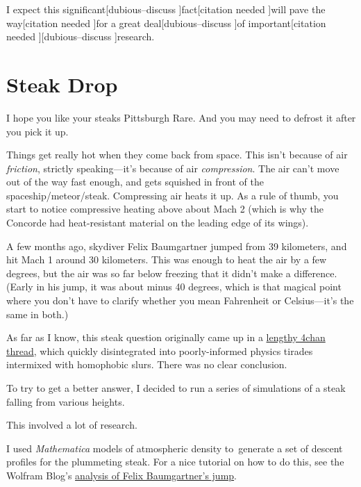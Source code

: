 {I expect this significant[{dubious–discuss} ]fact[{citation needed} ]will pave the way[{citation needed} ]for a great deal[{dubious–discuss} ]of important[{citation needed} ][{dubious–discuss} ]research.}

{
\chapter{Steak Drop}
}

\hfill{}

{I hope you like your steaks Pittsburgh Rare. And you may need to defrost it after you pick it up.}

{Things get really hot when they come back from space. This isn’t because of air \emph{friction}, strictly speaking—it’s because of air \emph{compression}. The air can’t move out of the way fast enough, and gets squished in front of the spaceship/meteor/steak. Compressing air heats it up. As a rule of thumb, you start to notice compressive heating above about Mach 2 (which is why the Concorde had heat-resistant material on the leading edge of its wings).}

{A few months ago, skydiver Felix Baumgartner jumped from 39 kilometers, and hit Mach 1 around 30 kilometers. This was enough to heat the air by a few degrees, but the air was so far below freezing that it didn’t make a difference. (Early in his jump, it was about minus 40 degrees, which is that magical point where you don’t have to clarify whether you mean Fahrenheit or Celsius—it’s the same in both.)}

{As far as I know, this steak question originally came up in a \href{http://m.chanarchive.org/4chan/sci/63224/5209640\#p5209833}{lengthy 4chan thread}, which quickly disintegrated into poorly-informed physics tirades intermixed with homophobic slurs. There was no clear conclusion.}

{To try to get a better answer, I decided to run a series of simulations of a steak falling from various heights.}

{This involved a lot of research.}

{I used \emph{Mathematica} models of atmospheric density to generate a set of descent profiles for the plummeting steak. For a nice tutorial on how to do this, see the Wolfram Blog’s \href{http://blog.wolfram.com/2012/10/24/falling-faster-than-the-speed-of-sound/}{analysis of Felix Baumgartner’s jump}.}

